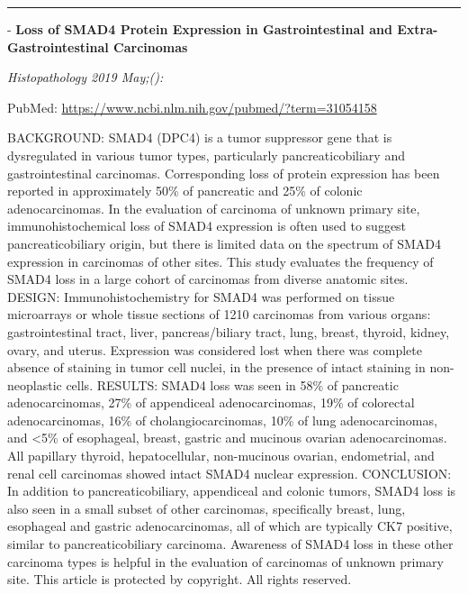 \documentclass[]{article}
\begin{document}
{}

\begin{center}\rule{0.5\linewidth}{\linethickness}\end{center}

 - \textbf{Loss of SMAD4 Protein Expression in Gastrointestinal and
Extra-Gastrointestinal Carcinomas}

\emph{Histopathology 2019 May;():}

PubMed: \url{https://www.ncbi.nlm.nih.gov/pubmed/?term=31054158}

BACKGROUND: SMAD4 (DPC4) is a tumor suppressor gene that is dysregulated
in various tumor types, particularly pancreaticobiliary and
gastrointestinal carcinomas. Corresponding loss of protein expression
has been reported in approximately 50\% of pancreatic and 25\% of
colonic adenocarcinomas. In the evaluation of carcinoma of unknown
primary site, immunohistochemical loss of SMAD4 expression is often used
to suggest pancreaticobiliary origin, but there is limited data on the
spectrum of SMAD4 expression in carcinomas of other sites. This study
evaluates the frequency of SMAD4 loss in a large cohort of carcinomas
from diverse anatomic sites. DESIGN: Immunohistochemistry for SMAD4 was
performed on tissue microarrays or whole tissue sections of 1210
carcinomas from various organs: gastrointestinal tract, liver,
pancreas/biliary tract, lung, breast, thyroid, kidney, ovary, and
uterus. Expression was considered lost when there was complete absence
of staining in tumor cell nuclei, in the presence of intact staining in
non-neoplastic cells. RESULTS: SMAD4 loss was seen in 58\% of pancreatic
adenocarcinomas, 27\% of appendiceal adenocarcinomas, 19\% of colorectal
adenocarcinomas, 16\% of cholangiocarcinomas, 10\% of lung
adenocarcinomas, and \textless{}5\% of esophageal, breast, gastric and
mucinous ovarian adenocarcinomas. All papillary thyroid, hepatocellular,
non-mucinous ovarian, endometrial, and renal cell carcinomas showed
intact SMAD4 nuclear expression. CONCLUSION: In addition to
pancreaticobiliary, appendiceal and colonic tumors, SMAD4 loss is also
seen in a small subset of other carcinomas, specifically breast, lung,
esophageal and gastric adenocarcinomas, all of which are typically CK7
positive, similar to pancreaticobiliary carcinoma. Awareness of SMAD4
loss in these other carcinoma types is helpful in the evaluation of
carcinomas of unknown primary site. This article is protected by
copyright. All rights reserved.

{}

{}
\end{document}

